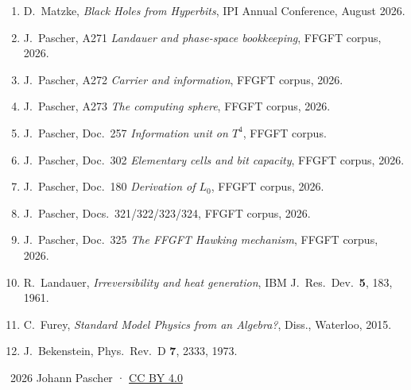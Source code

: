 \begin{enumerate}
  \item D.\ Matzke, \textit{Black Holes from Hyperbits}, IPI Annual Conference, August 2026.
  \item J.\ Pascher, A271 \textit{Landauer and phase-space bookkeeping}, FFGFT corpus, 2026.
  \item J.\ Pascher, A272 \textit{Carrier and information}, FFGFT corpus, 2026.
  \item J.\ Pascher, A273 \textit{The computing sphere}, FFGFT corpus, 2026.
  \item J.\ Pascher, Doc.\ 257 \textit{Information unit on $T^4$}, FFGFT corpus.
  \item J.\ Pascher, Doc.\ 302 \textit{Elementary cells and bit capacity}, FFGFT corpus, 2026.
  \item J.\ Pascher, Doc.\ 180 \textit{Derivation of $L_0$}, FFGFT corpus, 2026.
  \item J.\ Pascher, Docs.\ 321/322/323/324, FFGFT corpus, 2026.
  \item J.\ Pascher, Doc.\ 325 \textit{The FFGFT Hawking mechanism}, FFGFT corpus, 2026.
  \item R.\ Landauer, \textit{Irreversibility and heat generation}, IBM J.\ Res.\ Dev.\ \textbf{5}, 183, 1961.
  \item C.\ Furey, \textit{Standard Model Physics from an Algebra?}, Diss., Waterloo, 2015.
  \item J.\ Bekenstein, Phys.\ Rev.\ D \textbf{7}, 2333, 1973.
\end{enumerate}

\vspace{6pt}\noindent\small
\textcopyright\ 2026 Johann Pascher · \href{https://creativecommons.org/licenses/by/4.0/}{CC BY 4.0}
